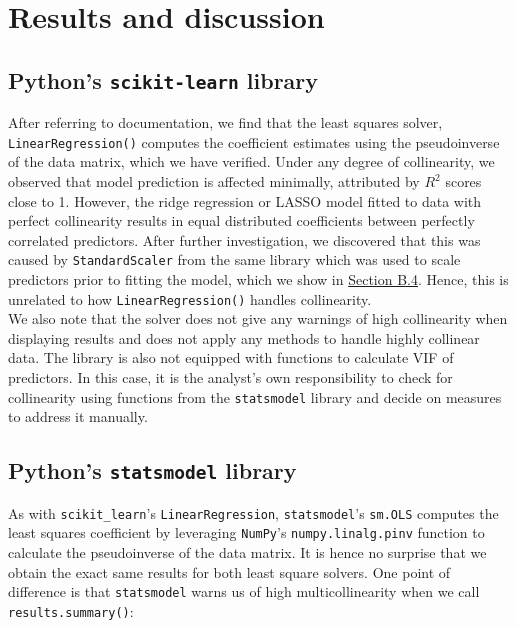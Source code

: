 \documentclass[12pt]{article}
\begin{document}
	
	\section{Results and discussion}
	\subsection{Python's \texttt{scikit-learn} library}
	
	After referring to documentation, we find that the least squares solver, \texttt{LinearRegression()} computes the coefficient estimates using the pseudoinverse of the data matrix, which we have verified. Under any degree of collinearity, we observed that model prediction is affected minimally, attributed by $R^2$ scores close to 1. However, the ridge regression or LASSO model fitted to data with perfect collinearity results in equal distributed coefficients between perfectly correlated predictors. After further investigation, we discovered that this was caused by \texttt{StandardScaler} from the same library which was used to scale predictors prior to fitting the model, which we show in \hyperref[sec:append4]{Section B.4}. Hence, this is unrelated to how \texttt{LinearRegression()} handles collinearity.\\
	
	We also note that the solver does not give any warnings of high collinearity when displaying results and does not apply any methods to handle highly collinear data. The library is also not equipped with functions to calculate VIF of predictors. In this case, it is the analyst's own responsibility to check for collinearity using functions from the \texttt{statsmodel} library and decide on measures to address it manually.
	
	\subsection{Python's \texttt{statsmodel} library}
	
	As with \texttt{scikit\_learn}'s \texttt{LinearRegression}, \texttt{statsmodel}'s \texttt{sm.OLS} computes the least squares coefficient by leveraging \texttt{NumPy}'s \texttt{numpy.linalg.pinv} function to calculate the pseudoinverse of the data matrix. It is hence no surprise that we obtain the exact same results for both least square solvers. One point of difference is that \texttt{statsmodel} warns us of high multicollinearity when we call \texttt{results.summary()}: \\
	
\end{document}
